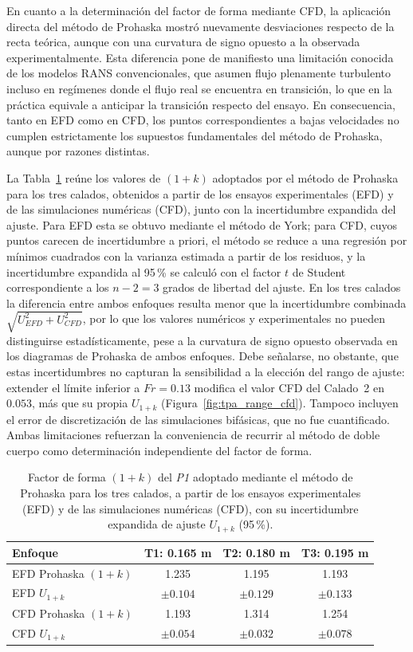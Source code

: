 En cuanto a la determinación del factor de forma mediante CFD, la aplicación directa del método de Prohaska mostró nuevamente desviaciones respecto de la recta teórica, aunque con una curvatura de signo opuesto a la observada experimentalmente. Esta diferencia pone de manifiesto una limitación conocida de los modelos RANS convencionales, que asumen flujo plenamente turbulento incluso en regímenes donde el flujo real se encuentra en transición, lo que en la práctica equivale a anticipar la transición respecto del ensayo. En consecuencia, tanto en EFD como en CFD, los puntos correspondientes a bajas velocidades no cumplen estrictamente los supuestos fundamentales del método de Prohaska, aunque por razones distintas.


La Tabla~\ref{tab:form_factors_efd_cfd} reúne los valores de $(1+k)$ adoptados
por el método de Prohaska para los tres calados, obtenidos a partir de los
ensayos experimentales (EFD) y de las simulaciones numéricas (CFD), junto con
la incertidumbre expandida del ajuste. Para EFD esta se obtuvo mediante el
método de York; para CFD, cuyos puntos carecen de incertidumbre a priori, el
método se reduce a una regresión por mínimos cuadrados con la varianza
estimada a partir de los residuos, y la incertidumbre expandida al 95\,\% se
calculó con el factor $t$ de Student correspondiente a los $n-2 = 3$ grados de
libertad del ajuste. En los tres calados la diferencia entre ambos enfoques
resulta menor que la incertidumbre combinada $\sqrt{U_{EFD}^2+U_{CFD}^2}$, por
lo que los valores numéricos y experimentales no pueden distinguirse
estadísticamente, pese a la curvatura de signo opuesto observada en los
diagramas de Prohaska de ambos enfoques. Debe señalarse, no obstante, que
estas incertidumbres no capturan la sensibilidad a la elección del rango de
ajuste: extender el límite inferior a $Fr = 0{.}13$ modifica el valor CFD del
Calado~2 en $0{.}053$, más que su propia $U_{1+k}$
(Figura~\ref{fig:tpa_range_cfd}). Tampoco incluyen el error de discretización
de las simulaciones bifásicas, que no fue cuantificado. Ambas limitaciones
refuerzan la conveniencia de recurrir al método de doble cuerpo como
determinación independiente del factor de forma.

\begin{table}[H]
\centering
\caption{Factor de forma $(1+k)$ del \textit{P1} adoptado mediante el método de
Prohaska para los tres calados, a partir de los ensayos experimentales (EFD) y
de las simulaciones numéricas (CFD), con su incertidumbre expandida de ajuste
$U_{1+k}$ (95\,\%).}
\begin{tabular}{lccc}
\hline
\textbf{Enfoque} & \textbf{T1: 0.165 m} & \textbf{T2: 0.180 m} & \textbf{T3: 0.195 m} \\
\hline
EFD Prohaska $(1+k)$ & 1.235 & 1.195 & 1.193 \\
EFD $U_{1+k}$        & $\pm 0{.}104$ & $\pm 0{.}129$ & $\pm 0{.}133$ \\
CFD Prohaska $(1+k)$ & 1.193 & 1.314 & 1.254 \\
CFD $U_{1+k}$        & $\pm 0{.}054$ & $\pm 0{.}032$ & $\pm 0{.}078$ \\
\hline
\end{tabular}
\label{tab:form_factors_efd_cfd}
\end{table}


